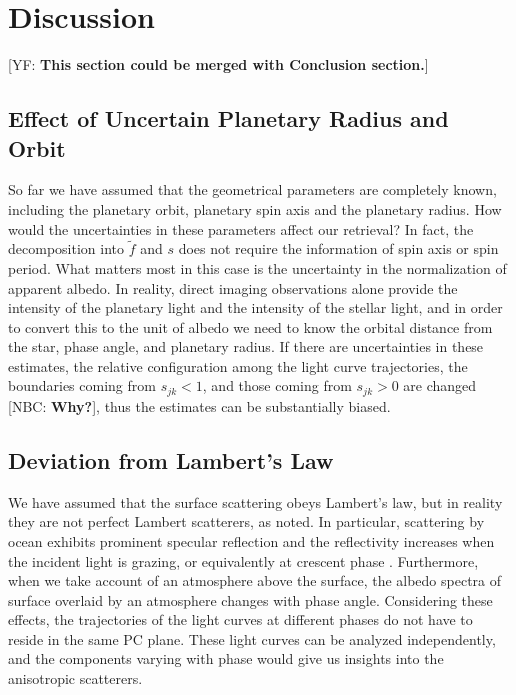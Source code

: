 \documentclass[iop,numberedappendix,apj,]{emulateapj}
\def\fast{\tilde f}
\def\memoYF#1{\color{red}[YF: {\bf #1}]\color{black}}
\def\memoNBC#1{\color{blue}[NBC: {\bf #1}]\color{black}}
\begin{document}
\section{Discussion}
\label{s:discussion}

\memoYF{This section could be merged with Conclusion section.}

\subsection{Effect of Uncertain Planetary Radius and Orbit}

So far we have assumed that the geometrical parameters are completely known, including the planetary orbit, planetary spin axis and the planetary radius. 
How would the uncertainties in these parameters affect our retrieval?
In fact, the decomposition into $\fast $ and $s$ does not require the information of spin axis or spin period. 
What matters most in this case is the uncertainty in the normalization of apparent albedo. 
In reality, direct imaging observations alone provide the intensity of the 
planetary light and the intensity of the stellar light, and in order to convert this to the unit of albedo we need to know the orbital distance from the star, phase angle, and planetary radius. 
If there are uncertainties in these estimates, the relative configuration among the light curve trajectories, the boundaries coming from $s_{jk} < 1$, and those coming from $s_{jk} > 0$ are changed \memoNBC{Why?}, thus the estimates can be substantially biased. 

\subsection{Deviation from Lambert's Law}
\label{ss:deviateLambert}

We have assumed that the surface scattering obeys Lambert's law, but in reality they are not perfect Lambert scatterers, as noted. 
In particular, scattering by ocean exhibits prominent specular reflection and the reflectivity increases when the incident light is grazing, or equivalently at crescent phase \citep[e.g.,][]{Williams2008}. 
Furthermore, when we take account of an atmosphere above the surface, the albedo spectra of surface overlaid by an atmosphere changes with phase angle.  
Considering these effects, the trajectories of the light curves at different phases do not have to reside in the same PC plane. 
These light curves can be analyzed independently, and the components varying with phase would give us insights into the anisotropic scatterers. 
\end{document}
